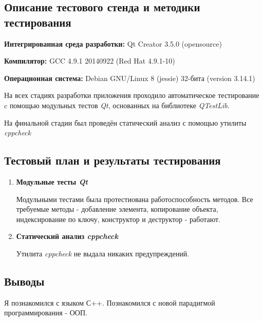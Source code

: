 \documentclass[12pt,a4paper]{report}
\begin{document}
\subsection{Описание тестового стенда и методики тестирования}

\begin{flushleft}
\textbf{Интегрированная среда разработки:} Qt Creator 3.5.0 (opensource)

\textbf{Компилятор:} GCC 4.9.1 20140922 (Red Hat 4.9.1-10)

\textbf{Операционная система:} Debian GNU/Linux 8 (jessie) 32-бита (version 3.14.1)
\end{flushleft}

На всех стадиях разработки приложения проходило автоматическое тестирование c помощью модульных тестов \textit{Qt}, основанных на библиотеке  \textit{QTestLib}.

На финальной стадии был проведён статический анализ с помощью утилиты \textit{cppcheck}%
\subsection{Тестовый план и результаты тестирования}
\hspace{\parindent}
\begin{enumerate}
\item \textbf{Модульные тесты \textit{Qt}}

Модульными тестами была протестиована работоспособность методов. Все требуемые методы - добавление элемента, копирование объекта, индексирование по ключу, конструктор и деструктор - работают.
\item \textbf{Статический анализ \textit{cppcheck}}

Утилита \textit{cppcheck} не выдала никаких предупреждений.
\end{enumerate}
\subsection{Выводы}
\hspace{\parindent}
Я познакомился с языком С++. Познакомился с новой парадигмой программирования - ООП.
\end{document}
